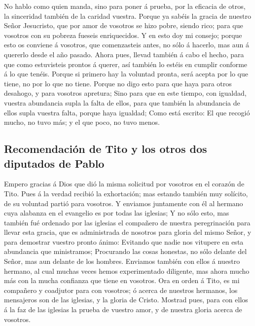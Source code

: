  No hablo como quien manda, sino para poner á prueba, por
la eficacia de otros, la sinceridad también de la caridad vuestra.
 Porque ya sabéis la gracia de nuestro Señor Jesucristo,
que por amor de vosotros se hizo pobre, siendo rico; para que vosotros
con su pobreza fueseis enriquecidos.  Y en esto doy mi
consejo; porque esto os conviene á vosotros, que comenzasteis antes, no
sólo á hacerlo, mas aun á quererlo desde el año pasado. 
Ahora pues, llevad también á cabo el hecho, para que como estuvisteis
prontos á querer, así también lo estéis en cumplir conforme á lo que
tenéis.  Porque si primero hay la voluntad pronta, será
acepta por lo que tiene, no por lo que no tiene.  Porque
no digo esto para que haya para otros desahogo, y para vosotros
apretura;  Sino para que en este tiempo, con igualdad,
vuestra abundancia supla la falta de ellos, para que también la
abundancia de ellos supla vuestra falta, porque haya igualdad;
 Como está escrito: El que recogió mucho, no tuvo más; y
el que poco, no tuvo menos.

\hypertarget{recomendaciuxf3n-de-tito-y-los-otros-dos-diputados-de-pablo}{%
\subsection{Recomendación de Tito y los otros dos diputados de
Pablo}\label{recomendaciuxf3n-de-tito-y-los-otros-dos-diputados-de-pablo}}

 Empero gracias á Dios que dió la misma solicitud por
vosotros en el corazón de Tito.  Pues á la verdad recibió
la exhortación; mas estando también muy solícito, de su voluntad partió
para vosotros.  Y enviamos juntamente con él al hermano
cuya alabanza en el evangelio es por todas las iglesias; 
Y no sólo esto, mas también fué ordenado por las iglesias el compañero
de nuestra peregrinación para llevar esta gracia, que es administrada de
nosotros para gloria del mismo Señor, y para demostrar vuestro pronto
ánimo:  Evitando que nadie nos vitupere en esta
abundancia que ministramos;  Procurando las cosas
honestas, no sólo delante del Señor, mas aun delante de los hombres.
 Enviamos también con ellos á nuestro hermano, al cual
muchas veces hemos experimentado diligente, mas ahora mucho más con la
mucha confianza que tiene en vosotros.  Ora en orden á
Tito, es mi compañero y coadjutor para con vosotros; ó acerca de
nuestros hermanos, los mensajeros son de las iglesias, y la gloria de
Cristo.  Mostrad pues, para con ellos á la faz de las
iglesias la prueba de vuestro amor, y de nuestra gloria acerca de
vosotros.

